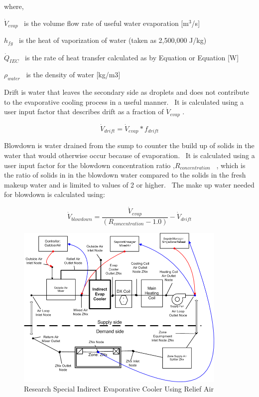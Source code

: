 where,

\({\dot V_{evap}}\) ~is the volume flow rate of useful water evaporation {[}m\(^{3}\)/s{]}

\({h_{fg}}\) ~is the heat of vaporization of water (taken as 2,500,000 J/kg)

\({\dot Q_{IEC}}\) ~is the rate of heat transfer calculated as by Equation or Equation {[}W{]}

\({\rho_{water}}\) ~is the density of water {[}kg/m3{]}

Drift is water that leaves the secondary side as droplets and does not contribute to the evaporative cooling process in a useful manner.~ It is calculated using a user input factor that describes drift as a fraction of \({\dot V_{evap}}\) .

\begin{equation}
{\dot V_{drift}} = {\dot V_{evap}} * {f_{drift}}
\end{equation}

Blowdown is water drained from the sump to counter the build up of solids in the water that would otherwise occur because of evaporation.~ It is calculated using a user input factor for the blowdown concentration ratio ,\({R_{concentration}}\) ~, which is the ratio of solids in in the blowdown water compared to the solids in the fresh makeup water and is limited to values of 2 or higher.~ The make up water needed for blowdown is calculated using:

\begin{equation}
{\dot V_{blowdown}} = \frac{{{{\dot V}_{evap}}}}{{\left( {{R_{concentration}} - 1.0} \right)}} - {\dot V_{drift}}
\end{equation}

\begin{figure}[hbtp] %
\centering
\includegraphics[width=0.9\textwidth, height=0.9\textheight, keepaspectratio=true]{media/image4833.png}
\caption{Research Special Indirect Evaporative Cooler Using Relief Air \protect \label{fig:research-special-indirect-evaporative-cooler-001}}
\end{figure}

